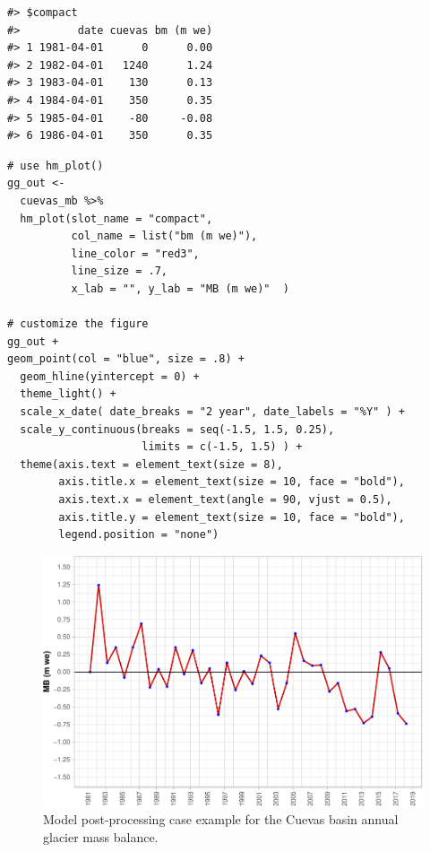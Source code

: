 \begin{verbatim}
#> $compact
#>         date cuevas bm (m we)
#> 1 1981-04-01      0      0.00
#> 2 1982-04-01   1240      1.24
#> 3 1983-04-01    130      0.13
#> 4 1984-04-01    350      0.35
#> 5 1985-04-01    -80     -0.08
#> 6 1986-04-01    350      0.35
\end{verbatim}

\begin{verbatim}
# use hm_plot()
gg_out <- 
  cuevas_mb %>% 
  hm_plot(slot_name = "compact", 
          col_name = list("bm (m we)"), 
          line_color = "red3", 
          line_size = .7, 
          x_lab = "", y_lab = "MB (m we)"  )
  
# customize the figure
gg_out + 
geom_point(col = "blue", size = .8) +
  geom_hline(yintercept = 0) +
  theme_light() + 
  scale_x_date( date_breaks = "2 year", date_labels = "%Y" ) +
  scale_y_continuous(breaks = seq(-1.5, 1.5, 0.25),
                     limits = c(-1.5, 1.5) ) +
  theme(axis.text = element_text(size = 8),
        axis.title.x = element_text(size = 10, face = "bold"),
        axis.text.x = element_text(angle = 90, vjust = 0.5),
        axis.title.y = element_text(size = 10, face = "bold"), 
        legend.position = "none") 
\end{verbatim}

\begin{figure}

{\centering \includegraphics[width=1\linewidth]{toum_files/figure-latex/cuevas-mb-1} 

}

\caption{Model post-processing case example for the Cuevas basin annual glacier mass balance.}\label{fig:cuevas-mb}
\end{figure}

